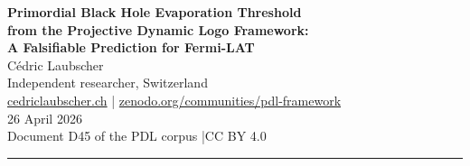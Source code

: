 \documentclass[12pt, a4paper]{article}
\theoremstyle{definition}
\begin{document}
\begin{center}
  {\LARGE\bfseries Primordial Black Hole Evaporation Threshold\\[4pt]
   from the Projective Dynamic Logo Framework:\\[4pt]
   A Falsifiable Prediction for Fermi-LAT}\\[18pt]
  {\large Cédric Laubscher}\\[6pt]
  {\normalsize Independent researcher, Switzerland}\\[4pt]
  {\normalsize \href{https://cedriclaubscher.ch}{cedriclaubscher.ch}
   \quad|\quad
   \href{https://zenodo.org/communities/pdl-framework}{zenodo.org/communities/pdl-framework}}\\[12pt]
  {\normalsize 26 April 2026}\\[4pt]
  {\small Document D45 of the PDL corpus \quad|\quad CC BY 4.0}
\end{center}

\vspace{6pt}
\hrule
\vspace{10pt}
\end{document}
